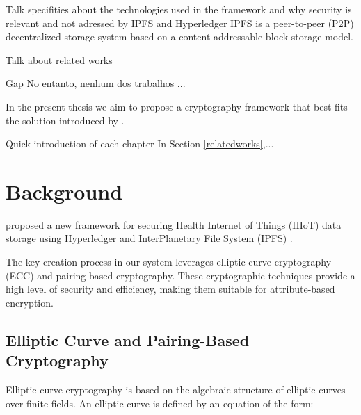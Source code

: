 \documentclass[cic,tc,english]{iiufrgs}
\begin{document}
    \begin{draft}{Talk specifities about the technologies used in the framework and why security is relevant and not adressed by IPFS and Hyperledger}
        IPFS \cite{benet2013ipfs} is a peer-to-peer (P2P) decentralized storage system based on a content-addressable block storage model.
    \end{draft}

    \begin{draft}{Talk about related works}
        
    \end{draft}

    \begin{draft}{Gap}
        No entanto, nenhum dos trabalhos ...
    \end{draft}


    In the present thesis we aim to propose a cryptography framework that best fits the solution introduced by \citet{laura2023}.


    \begin{draft}{Quick introduction of each chapter}
        In Section \ref{relatedworks},...

    \end{draft}

\chapter{Background}
    \label{chap:background}
    \citet{laura2023} proposed a new framework for securing Health Internet of Things (HIoT) data storage using Hyperledger and InterPlanetary File System (IPFS) \cite{benet2013ipfs}.

    The key creation process in our system leverages elliptic curve cryptography (ECC) and pairing-based cryptography. These cryptographic techniques provide a high level of security and efficiency, making them suitable for attribute-based encryption.

    \section{Elliptic Curve and Pairing-Based Cryptography}
        \label{sec:ecc}
        Elliptic curve cryptography is based on the algebraic structure of elliptic curves over finite fields. An elliptic curve is defined by an equation of the form:
\end{document}
